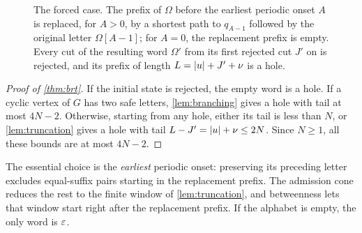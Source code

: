 \begin{figure}[t]
\centering
{}
\caption{The forced case. The prefix of $\Omega$ before the earliest periodic onset $A$ is
replaced, for $A>0$, by a shortest path to $q_{A-1}$ followed by the
original letter $\Omega[A-1]$; for $A=0$, the replacement prefix is empty.
Every cut of the resulting word $\Omega'$ from its first rejected cut $J'$ on is rejected,
and its prefix of length $L=\lvert u\rvert+J'+\nu$ is a hole.}
\label{fig:forced}
\end{figure}

\begin{proof}[Proof of \cref{thm:brt}]
If the initial state is rejected, the empty word is a hole. If a cyclic vertex of $G$ has
two safe letters, \cref{lem:branching} gives a hole with tail at most $4N - 2$.
Otherwise, starting from any hole, either its tail is less than $N$, or
\cref{lem:truncation} gives a hole with tail $L - J' = \lvert u\rvert + \nu \le 2N$. Since $N \ge 1$,
all these bounds are at most $4N - 2$.
\end{proof}



The essential choice is the \emph{earliest}
periodic onset: preserving its preceding letter excludes equal-suffix
pairs starting in the replacement prefix. The admission cone reduces the
rest to the finite window of \cref{lem:truncation}, and betweenness lets
that window start right after the replacement prefix. If the alphabet is
empty, the only word is $\varepsilon$.
